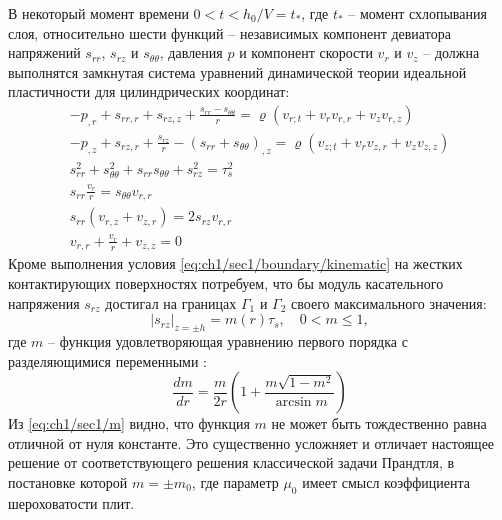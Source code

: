 В некоторый момент времени $0 < t < h_{0}/V = t_*$, где $t_*$ -- момент схлопывания слоя, относительно шести функций -- независимых компонент девиатора напряжений $s_{rr}$, $s_{rz}$ и $s_{\theta\theta}$, давления $p$ и компонент скорости $v_{r}$ и $v_{z}$ -- должна выполнятся замкнутая система уравнений динамической теории идеальной пластичности для цилиндрических координат:
\begin{subequations}
  \label{eqs:ch1/sec1/general}
  \begin{gather}
    \label{eqs:ch1/sec1/general/motion:1}
    -p_{,r}+s_{rr,r}+s_{rz,z}+\frac{s_{rr}-s_{\theta\theta}}{r} = \varrho \left(v_{r;t}+v_{r} v_{r,r} + v_{z} v_{r,z} \right)
    \\
    \label{eqs:ch1/sec1/general/motion:2}
    -p_{,z}+s_{rz,r}+\frac{s_{rz}}{r}-(s_{rr}+s_{\theta\theta})_{,z} = \varrho \left(v_{z;t}+v_{r} v_{z,r} + v_{z} v_{z,z} \right)
    \\
    \label{eqs:ch1/sec1/general/plasticity}
    s^2_{rr}+s^2_{\theta\theta}+s_{rr} s_{\theta\theta} + s^2_{rz}=\tau^2_{s}
    \\
    \label{eqs:ch1/sec1/general/coax:1}
    s_{rr} \frac{v_{r}}{r} = s_{\theta\theta} v_{r,r}
    \\
    \label{eqs:ch1/sec1/general/coax:2}
    s_{rr} (v_{r,z}+v_{z,r}) = 2 s_{rz} v_{r,r}
    \\
    \label{eqs:ch1/sec1/general/uncompress}
    v_{r,r}+\frac{v_{r}}{r}+v_{z,z} = 0
  \end{gather}
\end{subequations}
Кроме выполнения условия \cref{eq:ch1/sec1/boundary/kinematic} на жестких контактирующих поверхностях потребуем, что бы модуль касательного напряжения $s_{rz}$ достигал на границах $\Gamma_{1}$ и $\Gamma_{2}$ своего максимального значения:
\begin{equation}
  \label{eq:ch1/sec1/boundary/force}
  \lvert s_{rz}\lvert_{z=\pm h} = m(r) \tau_{s}, \quad 0 < m \le 1,
\end{equation}
где $m$ -- функция удовлетворяющая уравнению первого порядка с разделяющимися переменными \autocite{Georgievsky:2008}:
\begin{equation}
  \label{eq:ch1/sec1/m}
  \frac{dm}{dr}=\frac{m}{2r}\left(1+\frac{m\sqrt{1-m^2}}{\arcsin m}\right)
\end{equation}
Из \cref{eq:ch1/sec1/m} видно, что функция $m$ не может быть тождественно равна отличной от нуля константе. Это существенно усложняет и отличает настоящее решение от соответствующего решения классической задачи Прандтля, в постановке которой $m = \pm m_0$, где параметр $\mu_0$  имеет смысл коэффициента шероховатости плит.

